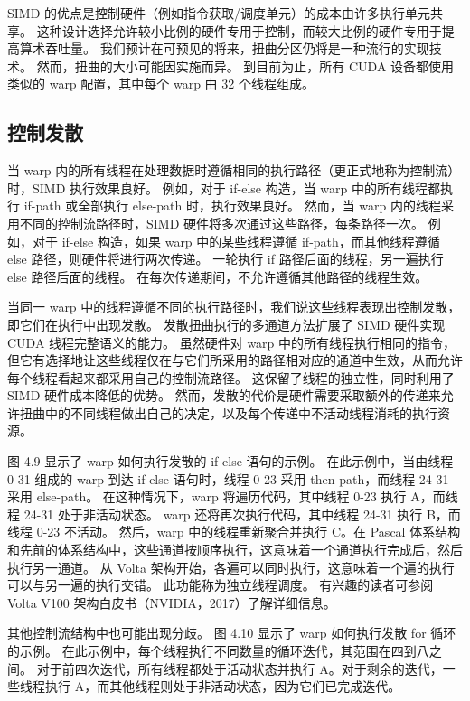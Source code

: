 SIMD 的优点是控制硬件（例如指令获取/调度单元）的成本由许多执行单元共享。 这种设计选择允许较小比例的硬件专用于控制，而较大比例的硬件专用于提高算术吞吐量。 我们预计在可预见的将来，扭曲分区仍将是一种流行的实现技术。 然而，扭曲的大小可能因实施而异。 到目前为止，所有 CUDA 设备都使用类似的 warp 配置，其中每个 warp 由 32 个线程组成。

\subsection{控制发散}
当 warp 内的所有线程在处理数据时遵循相同的执行路径（更正式地称为控制流）时，SIMD 执行效果良好。 例如，对于 if-else 构造，当 warp 中的所有线程都执行 if-path 或全部执行 else-path 时，执行效果良好。 然而，当 warp 内的线程采用不同的控制流路径时，SIMD 硬件将多次通过这些路径，每条路径一次。 例如，对于 if-else 构造，如果 warp 中的某些线程遵循 if-path，而其他线程遵循 else 路径，则硬件将进行两次传递。 一轮执行 if 路径后面的线程，另一遍执行 else 路径后面的线程。 在每次传递期间，不允许遵循其他路径的线程生效。

当同一 warp 中的线程遵循不同的执行路径时，我们说这些线程表现出控制发散，即它们在执行中出现发散。 发散扭曲执行的多通道方法扩展了 SIMD 硬件实现 CUDA 线程完整语义的能力。 虽然硬件对 warp 中的所有线程执行相同的指令，但它有选择地让这些线程仅在与它们所采用的路径相对应的通道中生效，从而允许每个线程看起来都采用自己的控制流路径。 这保留了线程的独立性，同时利用了 SIMD 硬件成本降低的优势。 然而，发散的代价是硬件需要采取额外的传递来允许扭曲中的不同线程做出自己的决定，以及每个传递中不活动线程消耗的执行资源。

图 4.9 显示了 warp 如何执行发散的 if-else 语句的示例。 在此示例中，当由线程 0-31 组成的 warp 到达 if-else 语句时，线程 0-23 采用 then-path，而线程 24-31 采用 else-path。 在这种情况下，warp 将遍历代码，其中线程 0-23 执行 A，而线程 24-31 处于非活动状态。 warp 还将再次执行代码，其中线程 24-31 执行 B，而线程 0-23 不活动。 然后，warp 中的线程重新聚合并执行 C。在 Pascal 体系结构和先前的体系结构中，这些通道按顺序执行，这意味着一个通道执行完成后，然后执行另一通道。 从 Volta 架构开始，各遍可以同时执行，这意味着一个遍的执行可以与另一遍的执行交错。 此功能称为独立线程调度。 有兴趣的读者可参阅 Volta V100 架构白皮书（NVIDIA，2017）了解详细信息。

其他控制流结构中也可能出现分歧。 图 4.10 显示了 warp 如何执行发散 for 循环的示例。 在此示例中，每个线程执行不同数量的循环迭代，其范围在四到八之间。 对于前四次迭代，所有线程都处于活动状态并执行 A。对于剩余的迭代，一些线程执行 A，而其他线程则处于非活动状态，因为它们已完成迭代。


